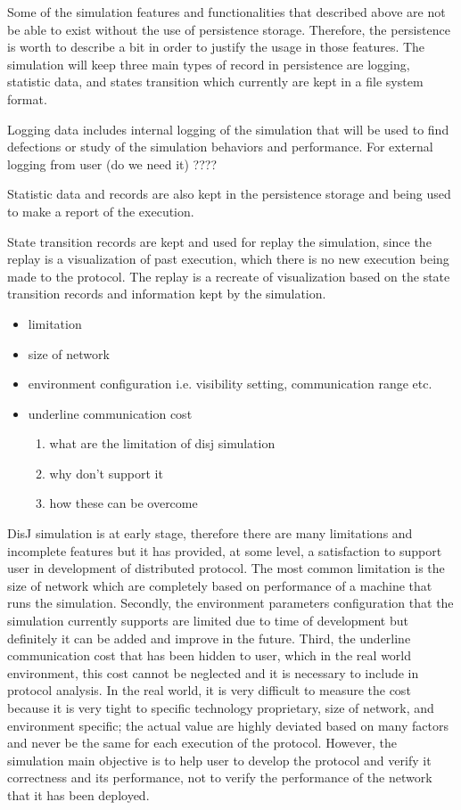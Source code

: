 Some of the simulation features and functionalities that described above are not be able to exist without the use of persistence storage. Therefore, the persistence is worth to describe a bit in order to justify the usage in those features. The simulation will keep three main types of record in persistence are logging, statistic data, and states transition which currently are kept in a file system format.

Logging data includes internal logging of the simulation that will be used to find defections or study of the simulation behaviors and performance. For external logging from user (do we need it) ????

Statistic data and records are also kept in the persistence storage and being used to make a report of the execution.

State transition records are kept and used for replay the simulation, since the replay is a visualization of past execution, which there is no new execution being made to the protocol. The replay is a recreate of visualization based on the state transition records and information kept by the simulation.

\begin{itemize}
\item limitation
\item size of network
\item environment configuration i.e. visibility setting, communication range etc.
\item underline communication cost
    \begin{enumerate}
    \item what are the limitation of disj simulation
    \item why don't support it
    \item how these can be overcome
    \end{enumerate}
\end{itemize}

DisJ simulation is at early stage, therefore there are many limitations and incomplete features but it has provided, at some level, a satisfaction to support user in development of distributed protocol. The most common limitation is the size of network which are completely based on performance of a machine that runs the simulation. Secondly, the environment parameters configuration that the simulation currently supports are limited due to time of development but definitely it can be added and improve in the future. Third, the underline communication cost that has been hidden to user, which in the real world environment, this cost cannot be neglected and it is necessary to include in protocol analysis. In the real world, it is very difficult to measure the cost because it is very tight to specific technology proprietary, size of network, and environment specific; the actual value are highly deviated based on many factors and never be the same for each execution of the protocol. However, the simulation main objective is to help user to develop the protocol and verify it correctness and its performance, not to verify the performance of the network that it has been deployed.


